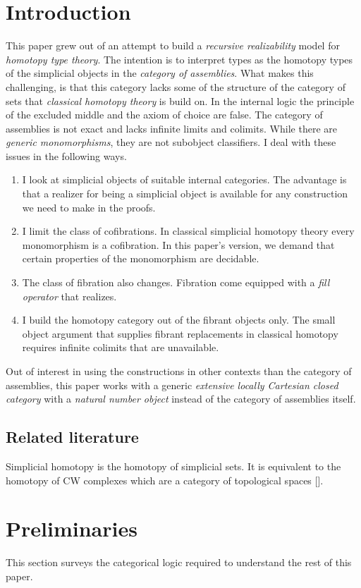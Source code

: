 \documentclass{tac}
\newcommand\citep[1]{[\cite{#1}]}
\begin{document}
\section{Introduction}
This paper grew out of an attempt to build a \emph{recursive realizability} model for \emph{homotopy type theory}. The intention is to interpret types as the homotopy types of the simplicial objects in the \emph{category of assemblies}. What makes this challenging, is that this category lacks some of the structure of the category of sets that \emph{classical homotopy theory} is build on. In the internal logic the principle of the excluded middle and the axiom of choice are false. The category of assemblies is not exact and lacks infinite limits and colimits. While there are \emph{generic monomorphisms}, they are not subobject classifiers. I deal with these issues in the following ways.
\begin{enumerate}
\item I look at simplicial objects of suitable internal categories. The advantage is that a realizer for being a simplicial object is available for any construction we need to make in the proofs.
\item I limit the class of cofibrations. In classical simplicial homotopy theory every monomorphism is a cofibration. In this paper's version, we demand that certain properties of the monomorphism are decidable.
\item The class of fibration also changes. Fibration come equipped with a \emph{fill operator} that realizes.
\item I build the homotopy category out of the fibrant objects only. The small object argument that supplies fibrant replacements in classical homotopy requires infinite colimits that are unavailable.
\end{enumerate}
Out of interest in using the constructions in other contexts than the category of assemblies, this paper works with a generic \emph{extensive locally Cartesian closed category} with a \emph{natural number object} instead of the category of assemblies itself.

\subsection{Related literature}
Simplicial homotopy is the homotopy of simplicial sets. It is equivalent to the homotopy of CW complexes which are a category of topological spaces \citep{Hovey99,GJSHT}.

\section{Preliminaries}
This section surveys the categorical logic required to understand the rest of this paper.
\end{document}
